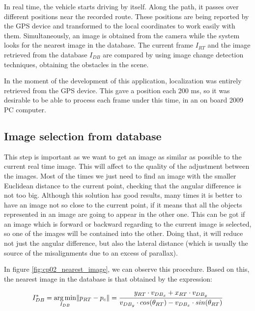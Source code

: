 In real time, the vehicle starts driving by itself. Along the path, it passes over different positions near the recorded route. These positions are being reported by the \ac{GPS} device and transformed to the local coordinates to work easily with them. Simultaneously, an image is obtained from the camera while the system looks for the nearest image in the database. The current frame $I_{RT}$ and the image retrieved from the database $I_{DB}$ are compared by using image change detection techniques, obtaining the obstacles in the scene.

In the moment of the development of this application, localization was entirely retrieved from the \ac{GPS} device. This gave a position each 200 ms, so it was desirable to be able to process each frame under this time, in an on board 2009 PC computer.

\subsection{Image selection from database}\label{ch:chapter02_01_01}

This step is important as we want to get an image as similar as possible to the current real time image. This will affect to the quality of the adjustment between the images. Most of the times we just need to find an image with the smaller Euclidean distance to the current point, checking that the angular difference is not too big. Although this solution has good results, many times it is better to have an image not so close to the current point, if it means that all the objects represented in an image are going to appear in the other one. This can be got if an image which is forward or backward regarding to the current image is selected, so one of the images will be contained into the other. Doing that, it will reduce not just the angular difference, but also the lateral distance (which is usually the source of the misalignments due to an excess of parallax).

In figure \ref{fig:cp02_nearest_image}, we can observe this procedure. Based on this, the nearest image in the database is that obtained by the expression:

\begin{equation}\label{eq:cp02_nearest_image}
I^*_{DB} = \underset{I_{DB}}{\arg\min} \|p_{RT} - p_c\| = {{y_{RT} \cdot v_{DB_x} + x_{RT} \cdot v_{DB_y}} \over 
  {v_{DB_y} \cdot cos(\theta_{RT}) - v_{DB_x} \cdot sin(\theta_{RT})}}
\end{equation}

